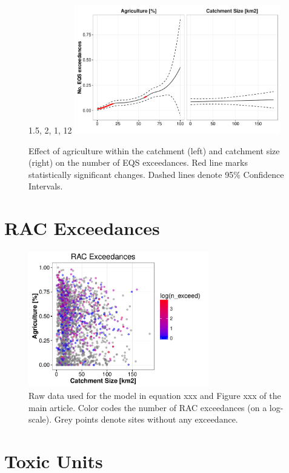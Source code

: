 \documentclass[pdftex,a4paper]{scrreprt}
\begin{document}
\begin{figure}1.5, 2, 1, 12
  \includegraphics[width=0.8\textwidth]{ezgagrieqsmodel}
  \caption{Effect of agriculture within the catchment (left) and catchment size (right) on the number of EQS exceedances. Red line marks statistically significant changes. Dashed lines denote 95\% Confidence Intervals.
  }
  \label{fig:ezgeqsagrimodel}
\end{figure}


\section{RAC Exceedances}
\begin{figure}[h]
	\centering
	\includegraphics[width = 0.7\textwidth]{ezgagrirac}
	\caption{Raw data used for the model in equation xxx and Figure xxx of the main article. Color codes the number of RAC exceedances (on a log-scale). Grey points denote sites without any exceedance.}
	\label{fig:ezgagrirac}
\end{figure}


\pagebreak
\section{Toxic Units}
\end{document}
